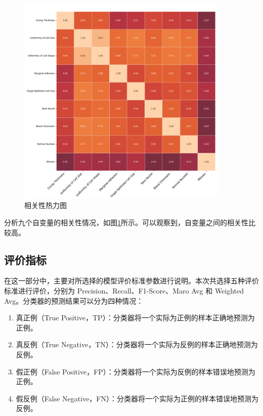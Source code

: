 \documentclass[a4paper,12pt,onecolumn,oneside]{article}
\begin{document}
\begin{figure}[H]
	\centering
	\includegraphics[width=0.9\textwidth]{res3/heatmap.png}
	\caption{相关性热力图}
	\label{fig:heatmap}
\end{figure}
分析九个自变量的相关性情况，如图\ref{fig:heatmap}所示。可以观察到，自变量之间的相关性比较高。
\clearpage
\subsection{评价指标}
在这一部分中，主要对所选择的模型评价标准参数进行说明。本次共选择五种评价标准进行评价，分别为 Precision、Recall、F1-Score、Maro Avg 和 Weighted Avg。分类器的预测结果可以分为四种情况：
\begin{enumerate}
	\item 真正例（True Positive，TP）：分类器将一个实际为正例的样本正确地预测为正例。
	\item 真反例（True Negative，TN）：分类器将一个实际为反例的样本正确地预测为反例。
	\item 假正例（False Positive，FP）：分类器将一个实际为反例的样本错误地预测为正例。
	\item 假反例（False Negative，FN）：分类器将一个实际为正例的样本错误地预测为反例。
\end{enumerate}
\end{document}
